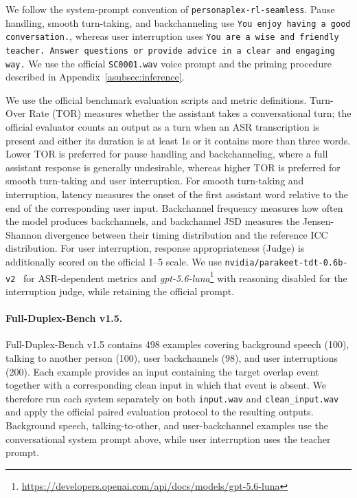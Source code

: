 We follow the system-prompt convention of \texttt{personaplex-rl-seamless}.
Pause handling, smooth turn-taking, and backchanneling use
\texttt{You enjoy having a good conversation.},
whereas user interruption uses
\texttt{You are a wise and friendly teacher. Answer questions or provide advice in a clear and engaging way.}
We use the official \texttt{SC0001.wav} voice prompt and the priming procedure described in Appendix~\ref{asubsec:inference}.

We use the official benchmark evaluation scripts and metric definitions.
Turn-Over Rate (TOR) measures whether the assistant takes a conversational turn; the official evaluator counts an output as a turn when an ASR transcription is present and either its duration is at least 1s or it contains more than three words.
Lower TOR is preferred for pause handling and backchanneling, where a full assistant response is generally undesirable, whereas higher TOR is preferred for smooth turn-taking and user interruption.
For smooth turn-taking and interruption, latency measures the onset of the first assistant word relative to the end of the corresponding user input.
Backchannel frequency measures how often the model produces backchannels, and backchannel JSD measures the Jensen-Shannon divergence between their timing distribution and the reference ICC distribution.
For user interruption, response appropriateness (Judge) is additionally scored on the official 1--5 scale.
We use \texttt{nvidia/parakeet-tdt-0.6b-v2}~\citep{pmlr-v202-xu23g} for ASR-dependent metrics and \textit{gpt-5.6-luna}\footnote{\url{https://developers.openai.com/api/docs/models/gpt-5.6-luna}} with reasoning disabled for the interruption judge, while retaining the official prompt.

\paragraph{Full-Duplex-Bench v1.5.}
Full-Duplex-Bench v1.5 contains 498 examples covering background speech (100), talking to another person (100), user backchannels (98), and user interruptions (200).
Each example provides an input containing the target overlap event together with a corresponding clean input in which that event is absent.
We therefore run each system separately on both \texttt{input.wav} and \texttt{clean\_input.wav} and apply the official paired evaluation protocol to the resulting outputs.
Background speech, talking-to-other, and user-backchannel examples use the conversational system prompt above, while user interruption uses the teacher prompt.

